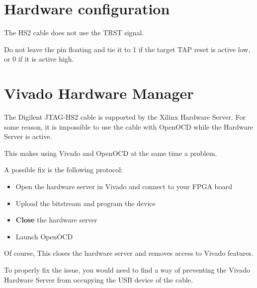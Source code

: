\documentclass{article}
\begin{document}
	\newpage
	\section{Hardware configuration}
	
	The HS2 cable does not use the TRST signal. 
	
	Do not leave the pin floating and tie it to 1 if the target TAP reset is active low, or 0 if it is active high.
	
	\section{Vivado Hardware Manager}
	
	The Digilent JTAG-HS2 cable is supported by the Xilinx Hardware Server. For some reason, it is impossible to use the cable with OpenOCD while the Hardware Server is active.
	
	This makes using Vivado and OpenOCD at the same time a problem.
	
	A possible fix is the following protocol:
	
	\vspace{-\topsep}
	\begin{itemize}
	\item Open the hardware server in Vivado and connect to your FPGA board
	\item Upload the bitstream and program the device
	\item \textbf{Close} the hardware server
	\item Launch OpenOCD
	\end{itemize}
	
	Of course, This closes the hardware server and removes access to Vivado features.
	
	To properly fix the issue, you would need to find a way of preventing the Vivado Hardware Server from occupying the USB device of the cable.
	
\end{document}
